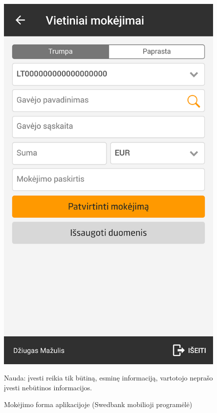 \documentclass{VUMIFPSkursinis}
\begin{document}
\begin{figure}[!htb]
	\begin{center}
	\includegraphics[scale=0.4]{mobileAppPaymentForm.png}
	\end{center}
  \caption{Mokėjimo forma aplikacijoje (Swedbank mobilioji programėlė)}
	\label{fig:mobileAppPaymentForm}
	Nauda:  įvesti reikia tik būtiną, esminę informaciją, vartotojo neprašo įvesti nebūtinos informacijos.
\end{figure}
\end{document}
